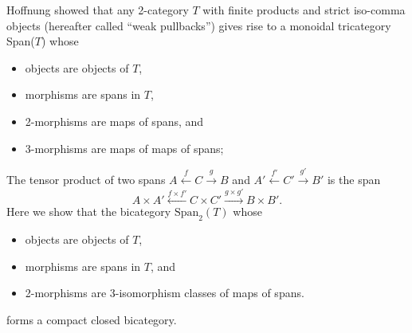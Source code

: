 \documentclass[12pt,twoside,openright]{report}
\newcommand{\Span}{\mbox{Span}}
\begin{document}
Hoffnung showed that any 2-category $T$ with finite products and strict iso-comma objects (hereafter called ``weak pullbacks'') gives rise to a monoidal tricategory Span($T$) whose
\begin{itemize}
  \item objects are objects of $T$,
  \item morphisms are spans in $T$,
  \item 2-morphisms are maps of spans, and
  \item 3-morphisms are maps of maps of spans;
\end{itemize}
The tensor product of two spans $A \stackrel{f}{\leftarrow} C \stackrel{g}{\rightarrow} B$ 
and $A' \stackrel{f'}{\leftarrow} C' \stackrel{g'}{\rightarrow} B'$ is the span
\[A \times A' \stackrel{f \times f'}{\leftarrow} C \times C' \stackrel{g \times g'}{\rightarrow} B \times B'.\]
Here we show that the bicategory $\Span_2(T)$ whose
\begin{itemize}
  \item objects are objects of $T$,
  \item morphisms are spans in $T$, and
  \item 2-morphisms are 3-isomorphism classes of maps of spans.
\end{itemize}
forms a compact closed bicategory.
\end{document}
